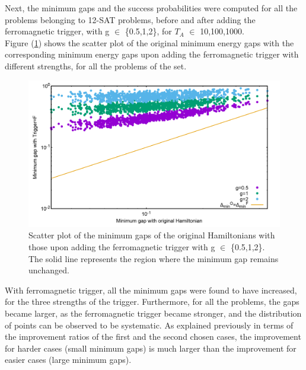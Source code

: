 \documentclass[../main.tex]{subfiles}
\begin{document}
Next, the minimum gaps and the success probabilities were computed for all the problems belonging to 12-SAT problems, before and after adding the ferromagnetic trigger, with g $\in$ \{0.5,1,2\}, for $T_A$ $\in$ {10,100,1000}. \\

Figure (\ref{fig:f10}) shows the scatter plot of the original minimum energy gaps with the corresponding minimum energy gaps upon adding the ferromagnetic trigger with different strengths, for all the problems of the set.

\begin{figure}[H]
\centering 
\includegraphics[scale=0.25]{Mingap_F_g0_1_2.png}
\caption{Scatter plot of the minimum gaps of the original Hamiltonians with those upon adding the ferromagnetic trigger with g $\in$ \{0.5,1,2\}. The solid line represents the region where the minimum gap remains unchanged.}
\label{fig:f10}
\end{figure}
With ferromagnetic trigger, all the minimum gaps were found to have increased, for  the three strengths of the trigger. Furthermore, for all the problems, the gaps became larger, as the ferromagnetic trigger became stronger, and the distribution of points can be observed to be systematic. As explained previously in terms of the improvement ratios of the first and the second chosen cases, the improvement for harder cases (small minimum gaps) is much larger than the improvement for easier cases (large minimum gaps).
\end{document}
